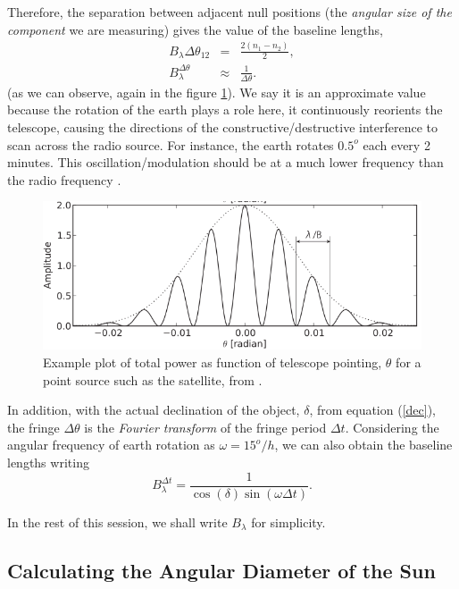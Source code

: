 Therefore, the separation between adjacent null positions (\ie the {\it angular size of the component} we are measuring) gives the value of the baseline lengths,
\begin{eqnarray}
B_{\lambda} \Delta \theta_{12} &=& \frac{2(n_1 - n_2)}{2},\nonumber \\
B^{\Delta \theta}_{\lambda} &\approx& \frac{1}{\Delta \theta}.
\end{eqnarray}
(as we can observe, again in the figure  \ref{bas}). We say it is an approximate value because the rotation of the earth plays a role here, it continuously reorients the telescope, causing the directions of the constructive/destructive interference to scan across the radio source. For instance, the earth rotates $0.5^o$ each every 2 minutes.  This oscillation/modulation should be at a much lower frequency than the radio frequency \cite{brand}.

\begin{figure}[htb]
\centering
 \includegraphics[scale=0.55]{figs/bas.png}
\caption{Example plot of total power as function of telescope pointing, $\theta$ for a point source such as the satellite, from \cite{sbu}. }
\label{bas}
\end{figure}


In addition, with the  actual  declination of the object, $\delta$, from equation (\ref{dec}), the fringe $\Delta \theta$ is the {\it Fourier transform} of the fringe period $\Delta t$.  Considering the angular frequency of earth rotation as $\omega = 15^o / h$, we can also obtain the baseline lengths writing 
\begin{equation}
  B^{\Delta t}_{\lambda} = \frac{1}{\cos(\delta) \sin(\omega \Delta t)}.
\label{BB}
\end{equation}

In the rest of this session, we shall write $B_{\lambda}$  for simplicity.




\bigskip

\subsection{Calculating the Angular Diameter of the Sun} \label{visb}


